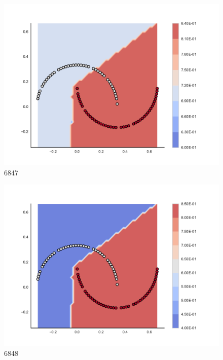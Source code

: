 \begin{subfigure}[b]{0.09\textwidth}
    \includegraphics[clip, trim=2.35cm 1.75cm 4.5cm 0cm,width=\textwidth]{img/convergence/6847.pdf}
    \caption{6847}
    \label{fig:convergence_6847}
\end{subfigure}
%
\begin{subfigure}[b]{0.09\textwidth}
    \includegraphics[clip, trim=2.35cm 1.75cm 4.5cm 0cm,width=\textwidth]{img/convergence/6848.pdf}
    \caption{6848}
    \label{fig:convergence_6848}
\end{subfigure}
%

